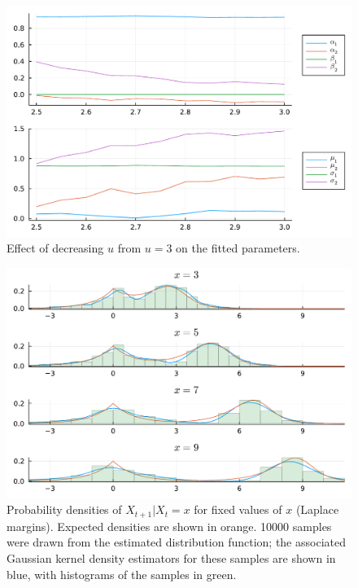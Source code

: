 \documentclass[11pt,twoside,openany]{book}
\numberwithin{Theorem}{chapter}
\numberwithin{Definition}{chapter}
\numberwithin{Lemma}{chapter}
\numberwithin{Algorithm}{chapter}
\numberwithin{equation}{chapter}
\begin{document}
\begin{figure}[htp]
  \centering
  \includegraphics[scale=0.7]{../ht-em/figures/worked_example_check_u.pdf}
  \caption{Effect of decreasing $u$ from $u=3$ on the fitted parameters.}\label{fig:worked_example_1_check_u}
\end{figure}

\begin{figure}[htp]
  \centering
  \includegraphics[scale=0.7]{../ht-em/figures/worked_example_vs_true_ecdf.pdf}
  \caption{Probability densities of $X_{t+1}|X_{t}=x$ for fixed values of $x$ (Laplace margins).
    Expected densities are shown in orange. 10000 samples were drawn from the
    estimated distribution function; the associated Gaussian kernel density estimators
    for these samples are shown in blue, with histograms of the samples in green.
   }\label{fig:worked_example_vs_true_1_resids}
\end{figure}
\FloatBarrier
\end{document}
